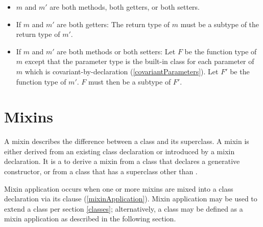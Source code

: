\documentclass[makeidx]{article}
\begin{document}
\begin{itemize}
\item
  $m$ and $m'$ are both methods, both getters, or both setters.
\item
  If $m$ and $m'$ are both getters:
  The return type of $m$ must be a subtype of the return type of $m'$.
\item
  If $m$ and $m'$ are both methods or both setters:
  Let $F$ be the function type of $m$
  except that the parameter type is the built-in class 
  for each parameter of $m$ which is covariant-by-declaration
  (\ref{covariantParameters}).
  Let $F'$ be the function type of $m'$.
  $F$ must then be a subtype of $F'$.

\end{itemize}



\section{Mixins}

\LMHash{}%
A mixin describes the difference between a class and its superclass.
A mixin is either derived from an existing class declaration
or introduced by a mixin declaration.
It is a  to derive a mixin from
a class that declares a generative constructor,
or from a class that has a superclass other than .

\LMHash{}%
Mixin application occurs when one or more mixins are mixed into
a class declaration via its \WITH{} clause (\ref{mixinApplication}).
Mixin application may be used to extend a class per section \ref{classes};
alternatively, a class may be defined as a mixin application
as described in the following section.
\end{document}
